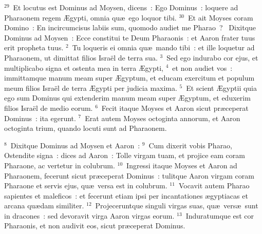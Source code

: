 ${}^{29}$~Et locutus est Dominus ad Moysen, dicens~: Ego Dominus~: loquere ad Pharaonem regem \AE gypti, omnia qu\ae\ ego loquor tibi.
${}^{30}$~Et ait Moyses coram Domino~: En incircumcisus labiis sum, quomodo audiet me Pharao~?
~Dixitque Dominus ad Moysen~: Ecce constitui te Deum Pharaonis~: et Aaron frater tuus erit propheta tuus.
${}^{2}$~Tu loqueris ei omnia qu\ae\ mando tibi~: et ille loquetur ad Pharaonem, ut dimittat filios Isra\"el de terra sua.
${}^{3}$~Sed ego indurabo cor ejus, et multiplicabo signa et ostenta mea in terra \AE gypti,
${}^{4}$~et non audiet vos~: immittamque manum meam super \AE gyptum, et educam exercitum et populum meum filios Isra\"el de terra \AE gypti per judicia maxima.
${}^{5}$~Et scient \AE gyptii quia ego sum Dominus qui extenderim manum meam super \AE gyptum, et eduxerim filios Isra\"el de medio eorum.
${}^{6}$~Fecit itaque Moyses et Aaron sicut pr\ae ceperat Dominus~: ita egerunt.
${}^{7}$~Erat autem Moyses octoginta annorum, et Aaron octoginta trium, quando locuti sunt ad Pharaonem.


${}^{8}$~Dixitque Dominus ad Moysen et Aaron~:
${}^{9}$~Cum dixerit vobis Pharao, Ostendite signa~: dices ad Aaron~: Tolle virgam tuam, et projice eam coram Pharaone, ac vertetur in colubrum.
${}^{10}$~Ingressi itaque Moyses et Aaron ad Pharaonem, fecerunt sicut pr\ae ceperat Dominus~: tulitque Aaron virgam coram Pharaone et servis ejus, qu\ae\ versa est in colubrum.
${}^{11}$~Vocavit autem Pharao sapientes et maleficos~: et fecerunt etiam ipsi per incantationes \ae gyptiacas et arcana qu\ae dam similiter.
${}^{12}$~Projeceruntque singuli virgas suas, qu\ae\ vers\ae\ sunt in dracones~: sed devoravit virga Aaron virgas eorum.
${}^{13}$~Induratumque est cor Pharaonis, et non audivit eos, sicut pr\ae ceperat Dominus.


